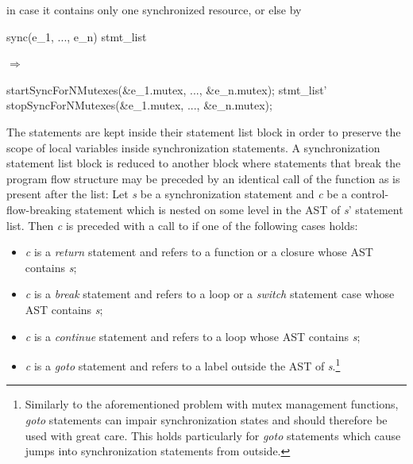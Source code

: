 in case it contains only one synchronized resource, or else by

\begin{center}
\begin{minipage}{0.3\textwidth}
\begin{ccode}
sync(e_1, ..., e_n) stmt_list
\end{ccode}
\end{minipage}
\qquad$\Longrightarrow$\qquad\qquad\qquad
\begin{minipage}{0.4\textwidth}
\begin{ccode}
startSyncForNMutexes(&e_1.mutex, ..., &e_n.mutex);
stmt_list'
stopSyncForNMutexes(&e_1.mutex, ..., &e_n.mutex);
\end{ccode}
\end{minipage}
\end{center}

The statements are kept inside their statement list block in order to preserve the scope of local variables inside synchronization statements. A synchronization statement list block is reduced to another block where statements that break the program flow structure may be preceded by an identical call of the  function as is present after the list: Let \textit{s} be a synchronization statement and \textit{c} be a control-flow-breaking statement which is nested on some level in the AST of \textit{s}' statement list. Then \textit{c} is preceded with a call to  if one of the following cases holds:
\begin{itemize}
\item \textit{c} is a \textit{return} statement and refers to a function or a closure whose AST contains \textit{s};
\item \textit{c} is a \textit{break} statement and refers to a loop or a \textit{switch} statement case whose AST contains \textit{s};
\item \textit{c} is a \textit{continue} statement and refers to a loop whose AST contains \textit{s};
\item \textit{c} is a \textit{goto} statement and refers to a label outside the AST of \textit{s}.\footnote{Similarly to the aforementioned problem with mutex management functions, \textit{goto} statements can impair synchronization states and should therefore be used with great care. This holds particularly for \textit{goto} statements which cause jumps into synchronization statements from outside.}
\end{itemize}

